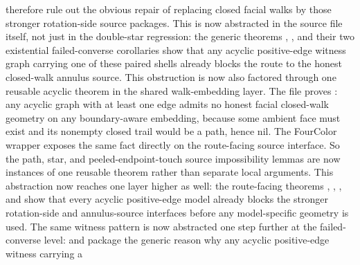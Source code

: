 \documentclass[11pt]{article}
\begin{document}
therefore rule out the obvious repair of replacing closed facial walks by
those stronger rotation-side source packages.  This is now abstracted in the source file itself, not just in the
double-star regression: the generic theorems
,
,
and their two existential failed-converse corollaries show that any acyclic
positive-edge witness graph carrying one of these paired shells already blocks
the route to the honest closed-walk annulus source.
This obstruction is now also factored through one reusable acyclic theorem in
the shared walk-embedding layer.  The file
 proves
:
any acyclic graph with at least one edge admits no honest facial closed-walk
geometry on any boundary-aware embedding, because some ambient face must exist
and its nonempty closed trail would be a path, hence nil.  The FourColor
wrapper
exposes the same fact directly on the route-facing source interface.  So the
path, star, and peeled-endpoint-touch source impossibility lemmas are now
instances of one reusable theorem rather than separate local arguments.  This
abstraction now reaches one layer higher as well: the route-facing theorems
,
,
,
and
show that every acyclic positive-edge model already blocks the stronger
rotation-side and annulus-source interfaces before any model-specific geometry
is used.
The same witness pattern is now abstracted one step further at the failed-converse
level: 
and
package the generic reason why any acyclic positive-edge witness carrying a
\end{document}

